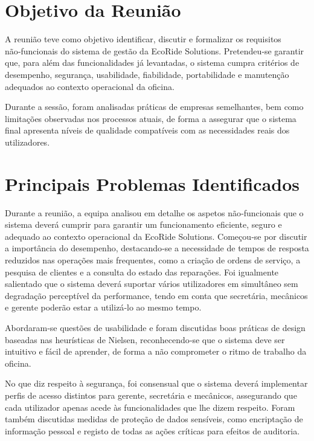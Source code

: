 \documentclass[12pt]{article}
\begin{document}
\section*{Objetivo da Reunião}

A reunião teve como objetivo identificar, discutir e formalizar os requisitos não‑funcionais do sistema de gestão da EcoRide Solutions. Pretendeu‑se garantir que, para além das funcionalidades já levantadas, o sistema cumpra critérios de desempenho, segurança, usabilidade, fiabilidade, portabilidade e manutenção adequados ao contexto operacional da oficina.

Durante a sessão, foram analisadas práticas de empresas semelhantes, bem como limitações observadas nos processos atuais, de forma a assegurar que o sistema final apresenta níveis de qualidade compatíveis com as necessidades reais dos utilizadores.

\vspace{0.5cm}

\section*{Principais Problemas Identificados}

Durante a reunião, a equipa analisou em detalhe os aspetos não‑funcionais que o sistema deverá cumprir para garantir um funcionamento eficiente, seguro e adequado ao contexto operacional da EcoRide Solutions. Começou‑se por discutir a importância do desempenho, destacando‑se a necessidade de tempos de resposta reduzidos nas operações mais frequentes, como a criação de ordens de serviço, a pesquisa de clientes e a consulta do estado das reparações. Foi igualmente salientado que o sistema deverá suportar vários utilizadores em simultâneo sem degradação perceptível da performance, tendo em conta que secretária, mecânicos e gerente poderão estar a utilizá‑lo ao mesmo tempo.

Abordaram‑se questões de usabilidade e foram discutidas boas práticas de design baseadas nas heurísticas de Nielsen, reconhecendo‑se que o sistema deve ser intuitivo e fácil de aprender, de forma a não comprometer o ritmo de trabalho da oficina.

No que diz respeito à segurança, foi consensual que o sistema deverá implementar perfis de acesso distintos para gerente, secretária e mecânicos, assegurando que cada utilizador apenas acede às funcionalidades que lhe dizem respeito. Foram também discutidas medidas de proteção de dados sensíveis, como encriptação de informação pessoal e registo de todas as ações críticas para efeitos de auditoria.
\end{document}
